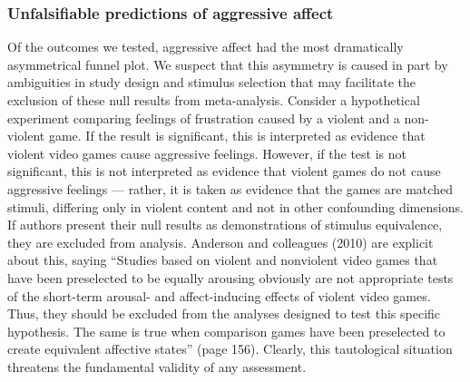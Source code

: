 \documentclass[man, mask]{apa6}
\begin{document}
\subsubsection{Unfalsifiable predictions of aggressive affect}
Of the outcomes we tested, aggressive affect had the most dramatically asymmetrical funnel plot. We suspect that this asymmetry is caused in part by ambiguities in study design and stimulus selection that may facilitate the exclusion of these null results from meta-analysis. Consider a hypothetical experiment comparing feelings of frustration caused by a violent and a non-violent game. If the result is significant, this is interpreted as evidence that violent video games cause aggressive feelings. However, if the test is not significant, this is not interpreted as evidence that violent games do not cause aggressive feelings --- rather, it is taken as evidence that the games are matched stimuli, differing only in violent content and not in other confounding dimensions. If authors present their null results as demonstrations of stimulus equivalence, they are excluded from analysis. Anderson and colleagues (2010) are explicit about this, saying ``Studies based on violent and nonviolent video games that have been preselected to be equally arousing obviously are not appropriate tests of the short-term arousal- and affect-inducing effects of violent video games. Thus, they should be excluded from the analyses designed to test this specific hypothesis. The same is true when comparison games have been preselected to create equivalent affective states'' (page 156).  Clearly, this tautological situation threatens the fundamental validity of any assessment.

\end{document}
